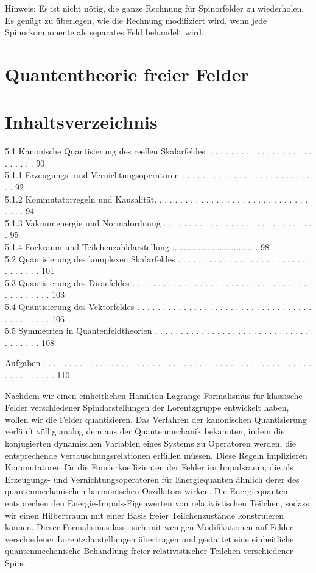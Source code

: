 \documentclass[10pt, letterpaper]{article}
\begin{document}
Hinweis: Es ist nicht nötig, die ganze Rechnung für Spinorfelder zu wiederholen. Es genügt zu überlegen, wie die Rechnung modifiziert wird, wenn jede Spinorkomponente als separates Feld behandelt wird.

\section*{Quantentheorie freier Felder}
\section*{Inhaltsverzeichnis}
5.1 Kanonische Quantisierung des reellen Skalarfeldes. . . . . . . . . . . . . . . . . . . . . . . . . . . 90\\
5.1.1 Erzeugungs- und Vernichtungsoperatoren . . . . . . . . . . . . . . . . . . . . . . . . . . . 92\\
5.1.2 Kommutatorregeln und Kausalität. . . . . . . . . . . . . . . . . . . . . . . . . . . . . . . . . . 94\\
5.1.3 Vakuumenergie und Normalordnung . . . . . . . . . . . . . . . . . . . . . . . . . . . . . . 95\\
5.1.4 Fockraum und Teilchenzahldarstellung .................................. . 98\\
5.2 Quantisierung des komplexen Skalarfeldes . . . . . . . . . . . . . . . . . . . . . . . . . . . . . . . . . 101\\
5.3 Quantisierung des Diracfeldes . . . . . . . . . . . . . . . . . . . . . . . . . . . . . . . . . . . . . . . . . . . 103\\
5.4 Quantisierung des Vektorfeldes . . . . . . . . . . . . . . . . . . . . . . . . . . . . . . . . . . . . . . . . . . . 106\\
5.5 Symmetrien in Quantenfeldtheorien . . . . . . . . . . . . . . . . . . . . . . . . . . . . . . . . . . . . . 108

Aufgaben . . . . . . . . . . . . . . . . . . . . . . . . . . . . . . . . . . . . . . . . . . . . . . . . . . . . . . . . . . . . . . 110

Nachdem wir einen einheitlichen Hamilton-Lagrange-Formalismus für klassische Felder verschiedener Spindarstellungen der Lorentzgruppe entwickelt haben, wollen wir die Felder quantisieren. Das Verfahren der kanonischen Quantisierung verläuft völlig analog dem aus der Quantenmechanik bekannten, indem die konjugierten dynamischen Variablen eines Systems zu Operatoren werden, die entsprechende Vertauschungsrelationen erfüllen müssen. Diese Regeln implizieren Kommutatoren für die Fourierkoeffizienten der Felder im Impulsraum, die als Erzeugungs- und Vernichtungsoperatoren für Energiequanten ähnlich derer des quantenmechanischen harmonischen Oszillators wirken. Die Energiequanten entsprechen den Energie-Impuls-Eigenwerten von relativistischen Teilchen, sodass wir einen Hilbertraum mit einer Basis freier Teilchenzustände konstruieren können. Dieser Formalismus lässt sich mit wenigen Modifikationen auf Felder verschiedener Lorentzdarstellungen übertragen und gestattet eine einheitliche quantenmechanische Behandlung freier relativistischer Teilchen verschiedener Spins.
\end{document}

